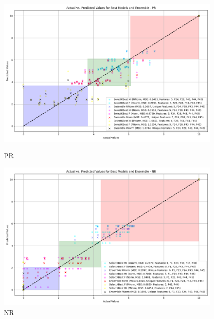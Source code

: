 \begin{figure}[H]
    \centering
    \begin{minipage}{0.45\textwidth}
        \centering
        \includegraphics[width=\linewidth]{reg_section_specific/featred_ensemble_learning/actual_vs_predicted_best_feature_selection_and_ensemble_PR_10.png}
        \caption{PR}
        \label{reg_spec_fig:pr_featred}
    \end{minipage}\hfill
    \begin{minipage}{0.45\textwidth}
        \centering
        \includegraphics[width=\linewidth]{reg_section_specific/featred_ensemble_learning/actual_vs_predicted_best_feature_selection_and_ensemble_NR_10.png}
        \caption{NR}
        \label{reg_spec_fig:nr_featred}
    \end{minipage}
\end{figure}


